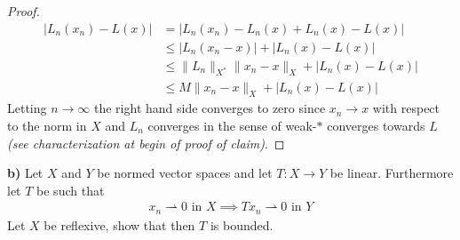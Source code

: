 \documentclass[12pt,a4paper]{article}
\theoremstyle{definition}
\newcommand{\wto}{\rightharpoonup}
\begin{document}
\begin{proof}
\begin{align*}
|L_n(x_n)-L(x)| &= |L_n(x_n)-L_n(x) + L_n(x)-L(x)| 
\\
& \leq | L_n (x_n-x)| + |L_n(x)-L(x)|  \\
& \leq \|L_n\|_{X^*} \|x_n-x\|_X + |L_n(x)-L(x)| \\
& \leq M \|x_n-x\|_X + |L_n(x) - L(x)|
\end{align*}
Letting $n \to \infty$ the right hand side converges to zero since $x_n \to x$ with respect to the norm in $X$ and $L_n$ converges in the sense of weak-$*$ converges towards $L$ \textit{(see characterization at begin of proof of claim)}. 
\end{proof}
\newpage
\noindent \textbf{b)} Let $X$ and $Y$ be normed vector spaces and let $T: X \to Y$ be linear. Furthermore let $T$ be such that \begin{align*}
x_n \wto 0 \text{ in } X \implies Tx_n \wto 0 \text{ in } Y
\end{align*}
Let $X$ be reflexive, show that then $T$ is bounded. 
\end{document}
